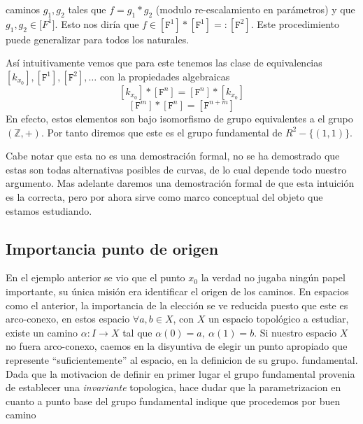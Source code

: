 {\begin{itemize}
  caminos \(g_1, g_2\) tales que \(f = g_1 * g_2\) (modulo re-escalamiento
  en parámetros) y que \(g_1, g_2 \in \mathtt [F ^1]\). Esto nos diría que
  \( f \in [\mathtt F ^1] * [\mathtt F ^1] =: [\mathtt F ^2]\). Este
  procedimiento puede generalizar para todos los naturales.
\end{itemize}
Así intuitivamente vemos que para este tenemos las clase de
equivalencias \([k_{x_0}], [\mathtt F ^1], [\mathtt F ^2], \dots \) con
la propiedades algebraicas
\[ [k_{x_0}] * [\mathtt F ^n] = [\mathtt F ^n] * [k_{x_0}]\]
\[ [\mathtt F ^m]  * [\mathtt F ^n] = [\mathtt F ^{n + m}]\]
En efecto, estos elementos son bajo isomorfismo de grupo equivalentes a
el grupo \((\mathbb{Z}, +)\). Por tanto diremos que este es el grupo
fundamental de \(R^2 - \{(1,1)\}\).

Cabe notar que esta no es una demostración formal, no se ha demostrado
que estas son todas alternativas posibles de curvas, de lo cual depende
todo nuestro argumento. Mas adelante daremos una demostración formal de
que esta intuición es la correcta, pero por ahora sirve como marco
conceptual del objeto que estamos estudiando.

\subsection{Importancia punto de origen}
En el ejemplo anterior se vio que el punto \(x_0\) la verdad no
jugaba ningún papel importante, su única misión era identificar el
origen de los caminos. En espacios como el anterior, la importancia de
la elección se ve reducida puesto que este es arco-conexo, en estos
espacio \(\forall a,b \in X\), con \(X\) un espacio topológico a
estudiar, existe un camino \(\alpha : I \to X\) tal que \(\alpha (0) =
a,\ \alpha (1) = b\). Si nuestro espacio \(X\) no fuera arco-conexo,
caemos en la disyuntiva de elegir un punto apropiado que represente
``suficientemente'' al espacio, en la definicion de su grupo.
fundamental. Dada que la motivacion de definir en primer lugar el grupo
fundamental provenia de establecer una \emph{invariante} topologica,
hace dudar que la parametrizacion en cuanto a punto base del grupo
fundamental indique que procedemos por buen camino

}
